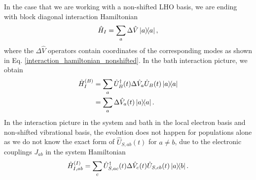 In the case that we are working with a non-shifted LHO basis, we are ending with block diagonal interaction Hamiltonian
\begin{equation}
    \hat{H}_{I} = \sum_{a} \Delta \hat{V} \ketbra{a},
\end{equation}
where the $\Delta \hat{V}$ operators contain coordinates of the corresponding modes as shown in Eq. \ref{interaction_hamiltonian_nonshifted}. In the bath interaction picture, we obtain
\begin{equation}
\label{int_ham_local_bathint}
    \begin{aligned}
    \hat{H}_{I}^{(B)} &= \sum_{a} \hat{U}^\dagger_B(t)\Delta \hat{V}_a\hat{U}_B(t) \ketbra{a} \\
    &= \sum_{a} \Delta \hat{V}_a(t) \ketbra{a}.
    \end{aligned}
\end{equation}
In the interaction picture in the system and bath in the local electron basis and non-shifted vibrational basis, the evolution does not happen for populations alone as we do not know the exact form of $\hat{U}_{S, ab}(t)$ for $a\neq b$, due to the electronic couplings $J_{ab}$ in the system Hamiltonian
\begin{equation}
    \begin{aligned}
    \hat{H}_{I, ab}^{(I)} &= \sum_{c} \hat{U}^\dagger_{S, ac}(t)\Delta \hat{V}_c(t)\hat{U}_{S, cb}(t) \ketbra{a}{b}. \\
    \end{aligned}
\end{equation}


